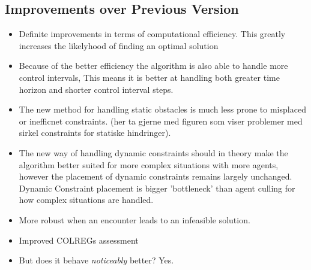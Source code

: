 \subsection{Improvements over Previous Version}
\begin{itemize}
    \item Definite improvements in terms of computational efficiency. This greatly increases the likelyhood of finding an optimal solution 
    \item Because of the better efficiency the algorithm is also able to handle more control intervals, This means it is better at handling both greater time horizon and shorter control interval steps.
    \item The new method for handling static obstacles is much less prone to misplaced or inefficnet constraints. (her ta gjerne med figuren som viser problemer med sirkel constraints for statiske hindringer).
    \item The new way of handling dynamic constraints should in theory make the algorithm better suited for more complex situations with more agents, however the placement of dynamic constraints remains largely unchanged.
    Dynamic Constraint placement is bigger 'bottleneck' than agent culling for how complex situations are handled. 
    \item More robust when an encounter leads to an infeasible solution.
    \item Improved COLREGs assessment
    \item But does it behave \textit{noticeably} better? Yes.
\end{itemize}

\newpage